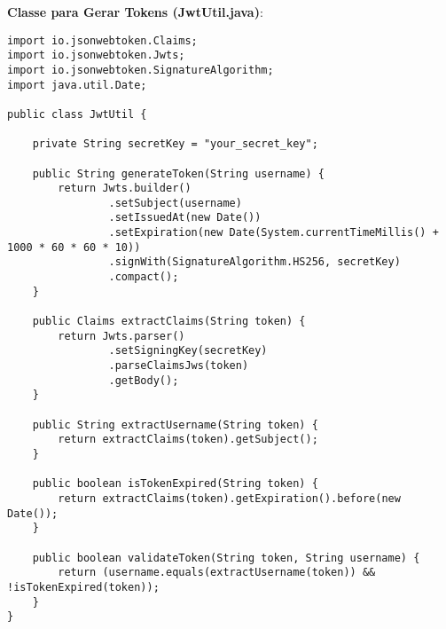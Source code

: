 \documentclass[a4paper,12pt]{book}
\begin{document}
\textbf{Classe para Gerar Tokens (JwtUtil.java)}:
\begin{verbatim}
import io.jsonwebtoken.Claims;
import io.jsonwebtoken.Jwts;
import io.jsonwebtoken.SignatureAlgorithm;
import java.util.Date;

public class JwtUtil {

    private String secretKey = "your_secret_key";

    public String generateToken(String username) {
        return Jwts.builder()
                .setSubject(username)
                .setIssuedAt(new Date())
                .setExpiration(new Date(System.currentTimeMillis() + 1000 * 60 * 60 * 10))
                .signWith(SignatureAlgorithm.HS256, secretKey)
                .compact();
    }

    public Claims extractClaims(String token) {
        return Jwts.parser()
                .setSigningKey(secretKey)
                .parseClaimsJws(token)
                .getBody();
    }

    public String extractUsername(String token) {
        return extractClaims(token).getSubject();
    }

    public boolean isTokenExpired(String token) {
        return extractClaims(token).getExpiration().before(new Date());
    }

    public boolean validateToken(String token, String username) {
        return (username.equals(extractUsername(token)) && !isTokenExpired(token));
    }
}
\end{verbatim}
\end{document}
